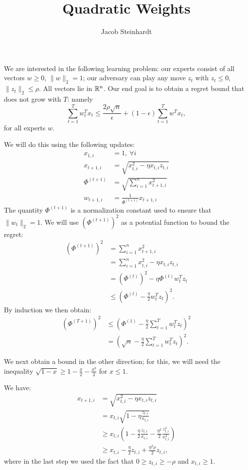 \documentclass[11pt]{article}
\title{Quadratic Weights}
\author{Jacob Steinhardt}
\begin{document}
\maketitle
We are interested in the following learning problem: our experts 
consist of all vectors $w \geq 0$, $\|w\|_2 = 1$; our adversary 
can play any move $z_t$ with $z_t \leq 0$, $\|z_t\|_2 \leq \rho$. 
All vectors lie in $\mathbb{R}^n$.
Our end goal is to obtain a regret bound that does not grow with $T$:
namely
\[ \sum_{t=1}^T w_t^Tx_t \leq \frac{2\rho \sqrt{n}}{\epsilon} + (1-\epsilon)\sum_{t=1}^T w^Tx_t, \]
for all experts $w$.

We will do this using the following updates:
\begin{align*}
        x_{1, i} &= 1,\ \forall i \\
        x_{t+1, i} &= \sqrt{x_{t,i}^2 - \eta x_{t,i}z_{t,i}} \\
        \Phi^{(t+1)} &= \sqrt{\sum_{i=1}^n x_{t+1,i}^2} \\
        w_{t+1,i} &= \frac{1}{\Phi^{(t+1)}}x_{t+1,i}
\end{align*}
The quantity $\Phi^{(t+1)}$ is a normalization constant used to 
ensure that $\|w_t\|_2 = 1$. We will use $(\Phi^{(t+1)})^2$ as a 
potential function to bound the regret:
\begin{align*}
        (\Phi^{(t+1)})^2 &= \sum_{i=1}^n x_{t+1,i}^2 \\
                         &= \sum_{i=1}^n x_{t,i}^2 - \eta x_{t,i}z_{t,i} \\
                         &= (\Phi^{(t)})^2 - \eta \Phi^{(t)}w_t^Tz_t \\
                         &\leq (\Phi^{(t)}-\frac{\eta}{2}w_t^Tz_t)^2.
\end{align*}
By induction we then obtain:
\begin{align}
        (\Phi^{(T+1)})^2 &\leq (\Phi^{(1)}-\frac{\eta}{2}\sum_{t=1}^Tw_t^Tz_t)^2 \\
                         &= (\sqrt{n}-\frac{\eta}{2}\sum_{t=1}^Tw_t^Tz_t)^2.
\end{align}

We next obtain a bound in the other direction; for this, we will need the 
inequality $\sqrt{1-x} \geq 1-\frac{x}{2}-\frac{x^2}{2}$ for $x \leq 1$.

We have:
\begin{align*}
        x_{t+1,i} &= \sqrt{x_{t,i}^2 - \eta x_{t,i}z_{t,i}} \\
                  &= x_{t,i}\sqrt{1-\eta\frac{z_{t,i}}{x_{t,i}}} \\
                  &\geq x_{t,i}(1-\frac{\eta}{2}\frac{z_{t,i}}{x_{t,i}} - \frac{\eta^2}{2}\frac{z_{t,i}^2}{x_{t,i}^2}) \\
                  &\geq x_{t,i} - \frac{\eta}{2}z_{t,i} + \frac{\eta^2\rho}{2}z_{t,i},
\end{align*}
where in the last step we used the fact 
that $0 \geq z_{t,i} \geq -\rho$ and $x_{t,i} \geq 1$.
\end{document}
